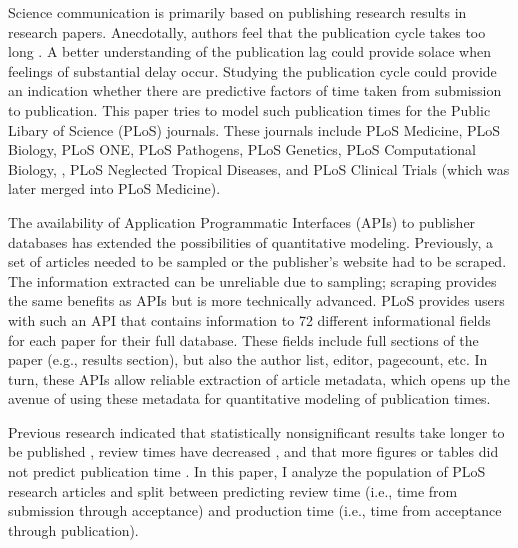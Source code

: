 Science communication is primarily based on publishing research results in research papers. Anecdotally, authors feel that the publication cycle takes too long \cite{Himmelstein2015-me}. A better understanding of the publication lag could provide solace when feelings of substantial delay occur. Studying the publication cycle could provide an indication whether there are predictive factors of time taken from submission to publication. This paper tries to model such publication times for the Public Libary of Science (PLoS) journals. These journals include PLoS Medicine, PLoS Biology, PLoS ONE, PLoS Pathogens, PLoS Genetics, PLoS Computational Biology, , PLoS Neglected Tropical Diseases, and PLoS Clinical Trials (which was later merged into PLoS Medicine).

The availability of Application Programmatic Interfaces (APIs) to publisher databases has extended the possibilities of quantitative modeling. Previously, a set of articles needed to be sampled or the publisher's website had to be scraped. The information extracted can be unreliable due to sampling; scraping provides the same benefits as APIs but is more technically advanced. PLoS provides users with such an API that contains information to 72 different informational fields for each paper for their full database. These fields include full sections of the paper (e.g., results section), but also the author list, editor, pagecount, etc. In turn, these APIs allow reliable extraction of article metadata, which opens up the avenue of using these metadata for quantitative modeling of publication times. 

Previous research indicated that statistically nonsignificant results take longer to be published \cite{ioannidis1998}, review times have decreased \cite{lyman2013}, and that more figures or tables did not predict publication time \cite{lee2013}. In this paper, I analyze the population of PLoS research articles and split between predicting review time (i.e., time from submission through acceptance) and production time (i.e., time from acceptance through publication). 